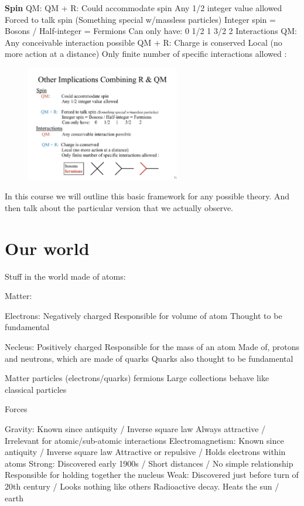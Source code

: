 \textbf{Spin}
QM: QM + R:
 Could accommodate spin
Any 1/2 integer value allowed
Forced to talk spin (Something special w/massless particles) Integer spin = Bosons / Half-integer = Fermions Can only have: 0 1/2 1 3/2 2
Interactions
QM: Any conceivable interaction possible
QM + R: Charge is conserved
Local (no more action at a distance)
Only finite number of specific interactions allowed :
\begin{figure}[h]
\centering
\includegraphics[width=0.6\textwidth]{./AllowedInteractions.pdf}
\end{figure}


In this course we will outline this basic framework for any possible theory.
And then talk about the particular version that we actually observe.


\section{Our world}

Stuff in the world made of atoms:

Matter:

Electrons: Negatively charged
Responsible for volume of atom
Thought to be fundamental

Necleus: Positively charged
Responsible for the mass of an atom
Made of, protons and neutrons, which are made of quarks 
Quarks also thought to be fundamental

Matter particles (electrons/quarks) fermions Large collections behave like classical particles

Forces


Gravity:
Known since antiquity / Inverse square law
Always attractive / Irrelevant for atomic/sub-atomic interactions
Electromagnetism:
Known since antiquity / Inverse square law
Attractive or repulsive / Holds electrons within atoms
Strong:
Discovered early 1900s / Short distances / No simple relationship Responsible for holding together the nucleus
Weak:
Discovered just before turn of 20th century / Looks nothing like others Radioactive decay. Heats the sun / earth

